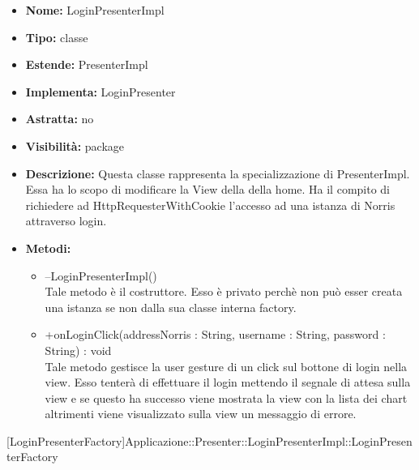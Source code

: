 			
			\begin{itemize}
			\item \textbf{Nome:} LoginPresenterImpl
			\item \textbf{Tipo:} classe
			
		\item \textbf{Estende:}
		PresenterImpl
		\item \textbf{Implementa:}
		LoginPresenter
		\item \textbf{Astratta:}
		no
			\item \textbf{Visibilità:} package
			\item \textbf{Descrizione:} Questa classe rappresenta la specializzazione di PresenterImpl. Essa ha lo scopo di modificare la View della della home. Ha il compito di richiedere ad HttpRequesterWithCookie l'accesso ad una istanza di Norris attraverso login.
			\item \textbf{Metodi:}
				\begin{itemize}
				\setlength{\itemsep}{5pt}
				
					\item[\ding{111}] {{--LoginPresenterImpl()}} \\ [1mm] Tale metodo è il costruttore. Esso è privato perchè non può esser creata una istanza se non dalla sua classe interna factory.
					\item[\ding{111}] {{+onLoginClick(addressNorris : String, username : String, password : String) : void}} \\ [1mm] Tale metodo gestisce la user gesture di un click sul bottone di login nella view. Esso tenterà di effettuare il login mettendo il segnale di attesa sulla view e se questo ha successo viene mostrata la view con la lista dei chart altrimenti viene visualizzato sulla view un messaggio di errore.
				\end{itemize}
		
			\end{itemize}

			
			[LoginPresenterFactory]{Applicazione::Presenter::LoginPresenterImpl::LoginPresenterFactory}
			

	
